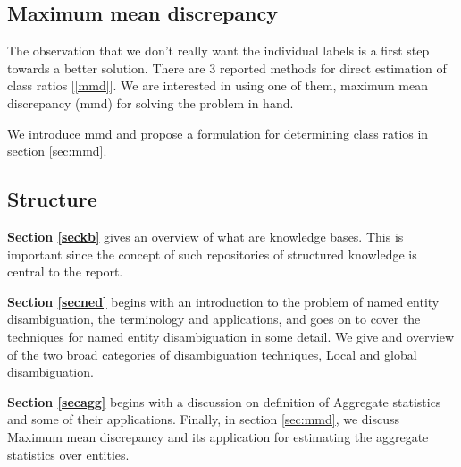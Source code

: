 \subsection{Maximum mean discrepancy}

The observation that we don't really want the individual labels is a first step towards a better solution. 
There are 3 reported methods for direct estimation of class ratios [\ref{mmd}]. We are interested in 
using one of them, maximum mean discrepancy (mmd) for solving the problem in hand.

We introduce mmd and propose a formulation for determining class ratios in section \ref{sec:mmd}.
\subsection{Structure}

\textbf{Section \ref{seckb}} gives an overview of what are knowledge bases. This is important 
since the concept of such repositories of structured knowledge is central to the
report. 

\textbf{Section \ref{secned}} begins with an introduction to the problem of named entity disambiguation, the 
terminology and applications, and goes on to cover the techniques for named entity disambiguation
in some detail. We give and overview of the two broad categories of disambiguation techniques, Local and
global disambiguation.

\textbf{Section \ref{secagg}} begins with a discussion on definition of Aggregate statistics and 
some of their applications. Finally, in section \ref{sec:mmd}, we discuss Maximum mean discrepancy and its 
application for estimating the aggregate statistics over entities.

